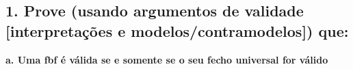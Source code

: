 \subsection*{1. Prove (usando argumentos de validade [interpretações e modelos/contramodelos]) que:}

\textbf{a. Uma fbf é válida se e somente se o seu fecho universal for válido}

